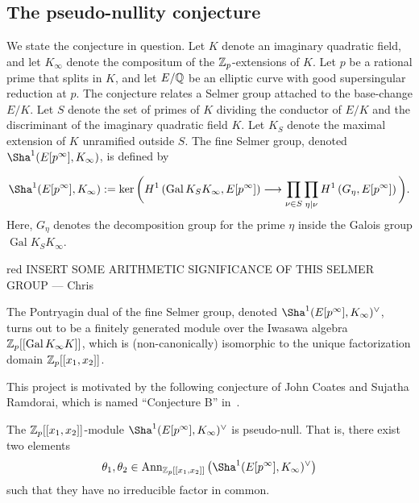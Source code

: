 \documentclass[a4paper,11pt]{article}
\newcommand{\CWnote}[1]{
 \begin{color}{red}
 \marginpar{$\spadesuit$} #1
  --- Chris
 \end{color}
}
\newcommand{\CWnote}[1]{

}
\DeclareMathOperator{\Gal}{Gal}
\numberwithin{equation}{section}
\begin{document}
\subsection{The pseudo-nullity conjecture}
We state the conjecture in question. Let $K$ denote an imaginary quadratic field, and let $K_\infty$ denote the compositum of the $\mathbb{Z}_p$-extensions of $K$. Let $p$ be a rational prime that splits in $K$, and let $E/\mathbb{Q}$ be an elliptic curve with good supersingular reduction at $p$. The conjecture relates a Selmer group attached to the base-change $E/K$. Let $S$ denote the set of primes of $K$ dividing the conductor of $E/K$ and the discriminant of the imaginary quadratic field $K$. Let $K_S$ denote the maximal extension of $K$ unramified outside $S$. The fine Selmer group, denoted $\Sha^1(E[p^\infty],K_\infty)$, is defined by

\begin{align*}
\Sha^1(E[p^\infty],K_\infty) := \ker\bigg(H^1\left(\Gal{K_S}{K_\infty},E[p^\infty]\right) \longrightarrow \prod_{\nu \in S} \prod_{\eta \mid \nu} H^1\left(G_\eta, E[p^\infty]\right) \bigg).
\end{align*}
Here, $G_\eta$ denotes the decomposition group for the prime $\eta$ inside the Galois group $\Gal{K_S}{K_\infty}$. 

\CWnote{INSERT SOME ARITHMETIC SIGNIFICANCE OF THIS SELMER GROUP}

The Pontryagin dual of the fine Selmer group, denoted $\Sha^1(E[p^\infty],K_\infty)^\vee$, turns out to be a finitely generated module over the Iwasawa algebra $\Z_p[[\Gal{K_\infty}{K}]]$, which is (non-canonically) isomorphic to the unique factorization domain $\mathbb{Z}_p[[x_1,x_2]]$.

This project is motivated by the following conjecture of John Coates and Sujatha Ramdorai, which is named ``Conjecture B'' in~\cite{MR2148798}.

\begin{conjecture*}\label{coates-sujatha-fine}
  The $\mathbb{Z}_p[[x_1,x_2]]$-module $\Sha^1(E[p^\infty],K_\infty)^\vee$ is pseudo-null. That is, there exist two elements
  \[
    \theta_1, \theta_2\in \mathrm{Ann}_{\Z_p[[x_1,x_2]]}\left(\Sha^1(E[p^\infty],K_\infty)^\vee\right)
  \]
  such that they have no irreducible factor in common.
\end{conjecture*}

\end{document}
